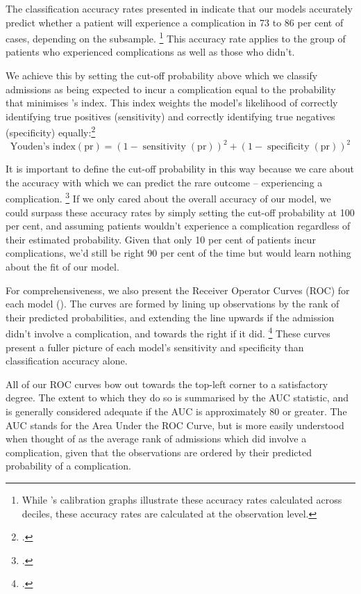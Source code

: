\documentclass[submission]{grattan}
\begin{document}
The classification accuracy rates presented in  indicate that our models accurately predict whether a patient will experience a complication in 73 to 86 per cent of cases, depending on the subsample.%
	\footnote{While 's calibration graphs illustrate these accuracy rates calculated across deciles, these accuracy rates are calculated at the observation level.}
This accuracy rate applies to the group of patients who experienced complications as well as those who didn't.

We achieve this by setting the cut-off probability above which we classify admissions as being expected to incur a complication equal to the probability that minimises \citeauthor{youden1950index}'s index.
This index weights the model's likelihood of correctly identifying true positives (sensitivity) and correctly identifying true negatives (specificity) equally:\footcite{youden1950index}
\[\text{Youden's index}(\mathrm{pr}) = (1 - \operatorname{sensitivity}(\mathrm{pr}))^2 + (1 - \operatorname{specificity}(\mathrm{pr}))^2\]

It is important to define the cut-off probability in this way because we care about the accuracy with which we can predict the rare outcome -- experiencing a complication.%
	\footcite{bhning2008revisiting}
If we only cared about the overall accuracy of our model, we could surpass these accuracy rates by simply setting the cut-off probability at 100 per cent, and assuming patients wouldn't experience a complication regardless of their estimated probability.
Given that only 10 per cent of patients incur complications, we'd still be right 90 per cent of the time but would learn nothing about the fit of our model.

For comprehensiveness, we also present the Receiver Operator Curves (ROC) for each model ().
The curves are formed by lining up observations by the rank of their predicted probabilities, and extending the line upwards if the admission didn't involve a complication, and towards the right if it did.%
	\footcite{Cameron-Trivedi-Microeconometrics-methods}
These curves present a fuller picture of each model's sensitivity and specificity than classification accuracy alone.

All of our ROC curves bow out towards the top-left corner to a satisfactory degree.
The extent to which they do so is summarised by the AUC statistic, and is generally considered adequate if the AUC is approximately 80 or greater.
The AUC stands for the Area Under the ROC Curve, but is more easily understood when thought of as the average rank of admissions which did involve a complication, given that the observations are ordered by their predicted probability of a complication.
\end{document}
